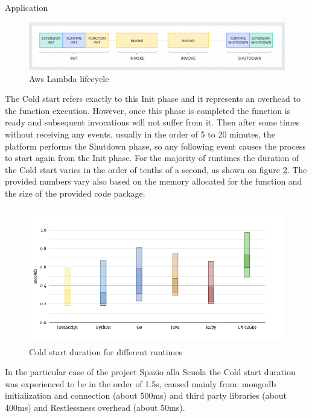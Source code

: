 \begin{chapter}{Application}
    \begin{figure}
        \centering
        \includegraphics[width=\linewidth]{source/images/aws-lambda-lifecycle.png}
        \caption{Aws Lambda lifecycle}
        \label{fig:aws_lambda_lifecycle}
    \end{figure}

    The Cold start refers exactly to this Init phase and it represents an overhead to the
    function execution. However, once this phase is completed the function is ready
    and subsequent invocations will not suffer from it. Then after some times without
    receiving any events, usually in the order of 5 to 20 minutes, the platform performs
    the Shutdown phase, so any following event causes the process to start again from
    the Init phase.
    For the majority of runtimes the duration of the Cold start varies in the order
    of tenths of a second, as shown on figure \ref{fig:cold_start_duration}. The provided
    numbers vary also based on the memory allocated for the function and the size of the
    provided code package.

    \begin{figure}
        \centering
        \includegraphics[width=\linewidth]{source/images/cold-start-duration.png}
        \caption{Cold start duration for different runtimes}
        \label{fig:cold_start_duration}
    \end{figure}

    In the particular case of the project Spazio alla Scuola the Cold start duration
    was experienced to be in the order of 1.5s, caused mainly from: mongodb
    initialization and connection (about 500ms) and third party libraries (about 400ms)
    and Restlessness overhead (about 50ms).


\end{chapter}
